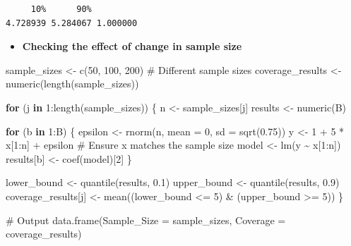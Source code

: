 \documentclass[
  11pt,
]{article}
\newenvironment{Shaded}{\begin{snugshade}}{\end{snugshade}}
\newcommand{\AttributeTok}[1]{\textcolor[rgb]{0.40,0.45,0.13}{#1}}
\newcommand{\CommentTok}[1]{\textcolor[rgb]{0.37,0.37,0.37}{#1}}
\newcommand{\ControlFlowTok}[1]{\textcolor[rgb]{0.00,0.23,0.31}{\textbf{#1}}}
\newcommand{\DecValTok}[1]{\textcolor[rgb]{0.68,0.00,0.00}{#1}}
\newcommand{\FloatTok}[1]{\textcolor[rgb]{0.68,0.00,0.00}{#1}}
\newcommand{\FunctionTok}[1]{\textcolor[rgb]{0.28,0.35,0.67}{#1}}
\newcommand{\NormalTok}[1]{\textcolor[rgb]{0.00,0.23,0.31}{#1}}
\newcommand{\OtherTok}[1]{\textcolor[rgb]{0.00,0.23,0.31}{#1}}
\newcommand{\SpecialCharTok}[1]{\textcolor[rgb]{0.37,0.37,0.37}{#1}}
\providecommand{\tightlist}{%
  \setlength{\itemsep}{0pt}\setlength{\parskip}{0pt}}\usepackage{longtable,booktabs,array}
\begin{document}
\begin{verbatim}
     10%      90%          
4.728939 5.284067 1.000000 
\end{verbatim}

\begin{itemize}
\tightlist
\item
  \textbf{Checking the effect of change in sample size}
\end{itemize}

\begin{Shaded}
\begin{Highlighting}[]
\NormalTok{sample\_sizes }\OtherTok{\textless{}{-}} \FunctionTok{c}\NormalTok{(}\DecValTok{50}\NormalTok{, }\DecValTok{100}\NormalTok{, }\DecValTok{200}\NormalTok{) }\CommentTok{\# Different sample sizes}
\NormalTok{coverage\_results }\OtherTok{\textless{}{-}} \FunctionTok{numeric}\NormalTok{(}\FunctionTok{length}\NormalTok{(sample\_sizes))}

\ControlFlowTok{for}\NormalTok{ (j }\ControlFlowTok{in} \DecValTok{1}\SpecialCharTok{:}\FunctionTok{length}\NormalTok{(sample\_sizes)) \{}
\NormalTok{  n }\OtherTok{\textless{}{-}}\NormalTok{ sample\_sizes[j]}
\NormalTok{  results }\OtherTok{\textless{}{-}} \FunctionTok{numeric}\NormalTok{(B)}
  
  \ControlFlowTok{for}\NormalTok{ (b }\ControlFlowTok{in} \DecValTok{1}\SpecialCharTok{:}\NormalTok{B) \{}
\NormalTok{    epsilon }\OtherTok{\textless{}{-}} \FunctionTok{rnorm}\NormalTok{(n, }\AttributeTok{mean =} \DecValTok{0}\NormalTok{, }\AttributeTok{sd =} \FunctionTok{sqrt}\NormalTok{(}\FloatTok{0.75}\NormalTok{))}
\NormalTok{    y }\OtherTok{\textless{}{-}} \DecValTok{1} \SpecialCharTok{+} \DecValTok{5} \SpecialCharTok{*}\NormalTok{ x[}\DecValTok{1}\SpecialCharTok{:}\NormalTok{n] }\SpecialCharTok{+}\NormalTok{ epsilon }\CommentTok{\# Ensure x matches the sample size}
\NormalTok{    model }\OtherTok{\textless{}{-}} \FunctionTok{lm}\NormalTok{(y }\SpecialCharTok{\textasciitilde{}}\NormalTok{ x[}\DecValTok{1}\SpecialCharTok{:}\NormalTok{n])}
\NormalTok{    results[b] }\OtherTok{\textless{}{-}} \FunctionTok{coef}\NormalTok{(model)[}\DecValTok{2}\NormalTok{]}
\NormalTok{  \}}
  
\NormalTok{  lower\_bound }\OtherTok{\textless{}{-}} \FunctionTok{quantile}\NormalTok{(results, }\FloatTok{0.1}\NormalTok{)}
\NormalTok{  upper\_bound }\OtherTok{\textless{}{-}} \FunctionTok{quantile}\NormalTok{(results, }\FloatTok{0.9}\NormalTok{)}
\NormalTok{  coverage\_results[j] }\OtherTok{\textless{}{-}} \FunctionTok{mean}\NormalTok{((lower\_bound }\SpecialCharTok{\textless{}=} \DecValTok{5}\NormalTok{) }\SpecialCharTok{\&}\NormalTok{ (upper\_bound }\SpecialCharTok{\textgreater{}=} \DecValTok{5}\NormalTok{))}
\NormalTok{\}}

\CommentTok{\# Output}
\FunctionTok{data.frame}\NormalTok{(}\AttributeTok{Sample\_Size =}\NormalTok{ sample\_sizes, }\AttributeTok{Coverage =}\NormalTok{ coverage\_results)}
\end{Highlighting}
\end{Shaded}
\end{document}
